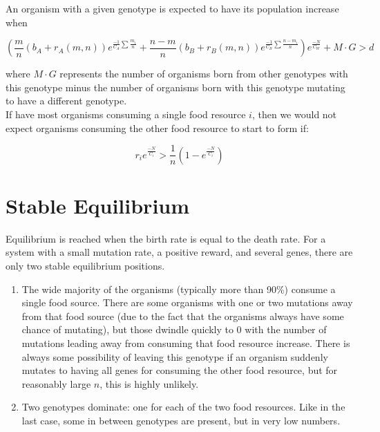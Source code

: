 \documentclass[11pt]{article}
\begin{document}
	An organism with a given genotype is expected to have its population increase when
	
	\begin{equation*}
		(\frac{m}{n}(b_A + r_A(m,n))e^{\frac{-1}{C_A}\sum{\frac{m_i}{n}}} + \frac{n - m}{n}(b_B + r_B(m,n))e^{\frac{-1}{C_B}\sum{\frac{n - m_i}{n}}})e^{\frac{-N}{C_W}} + M \cdot G > d
	\end{equation*}
	
	where $M \cdot G$ represents the number of organisms born from other genotypes with this genotype minus the number of organisms born with this genotype mutating to have a different genotype. \\
	
	If have most organisms consuming a single food resource $i$, then we would not expect organisms consuming the other food resource to start to form if:
	
	\begin{equation*}
		r_ie^{\frac{-N}{C_i}} > \frac{1}{n}(1 - e^{\frac{-N}{C_i}}) 
	\end{equation*}


\section*{Stable Equilibrium}

Equilibrium is reached when the birth rate is equal to the death rate. For a system with a small mutation rate, a positive reward, and several genes, there are only two stable equilibrium positions.

	\begin{enumerate}
		
		\item
		The wide majority of the organisms (typically more than 90\%) consume a single food source. There are some organisms with one or two mutations away from that food source (due to the fact that the organisms always have some chance of mutating), but those dwindle quickly to 0 with the number of mutations leading away from consuming that food resource increase. There is always some possibility of leaving this genotype if an organism suddenly mutates to having all genes for consuming the other food resource, but for reasonably large $n$, this is highly unlikely.
		
		\item
		Two genotypes dominate: one for each of the two food resources. Like in the last case, some in between genotypes are present, but in very low numbers.
		
	\end{enumerate}
	
\end{document}
